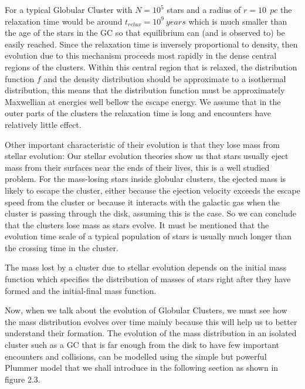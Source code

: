 For a typical Globular Cluster with $N=10^{5}$ stars and a radius of $r=10\:\:pc$ the relaxation time would be around $t_{relax}=10^{9}\:years$ which is much smaller than the age of the stars in the GC so that equilibrium can (and is observed to) be easily reached. Since the relaxation time is inversely proportional to density, then evolution due to this mechanism proceeds most rapidly in the dense central regions of the clusters. Within this central region that is relaxed, the distribution function $f$ and the density distribution should be approximate to a isothermal distribution, this means that the distribution function must be approximately Maxwellian at energies well bellow the escape energy. We assume that in the outer parts of the clusters the relaxation time is long and encounters have relatively little effect.

Other important characteristic of their evolution is that they lose mass from stellar evolution: Our stellar evolution theories show us that stars usually eject mass from their surfaces near the ends of their lives, this is a well studied problem. For the mass-losing stars inside globular clusters, the ejected mass is likely to escape the cluster, either because the ejection velocity exceeds the escape speed from the cluster or because it interacts with the galactic gas when the cluster is passing through the disk, assuming this is the case. So we can conclude that the clusters lose mass as stars evolve. It must be mentioned that the evolution time scale of a typical population of stars is usually much longer than the crossing time in the cluster.

The mass lost by a cluster due to stellar evolution depends on the initial mass function which specifies the distribution of masses of stars right after they have formed and the initial-final mass function. 

Now, when we talk about the evolution of Globular Clusters, we must see how the mass distribution evolves over time mainly because this will help us to better understand their formation. The evolution of the mass distribution in an isolated cluster such as a GC that is far enough from the disk to have few important encounters and collisions, can be modelled using the simple but powerful Plummer model that we shall introduce in the following section as shown in figure 2.3.

